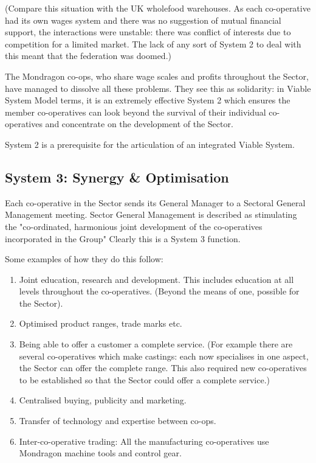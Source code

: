 (Compare this situation with the UK wholefood warehouses. As each co-operative had its own wages system and there was no suggestion of mutual financial support, the interactions were unstable: there was conflict of interests due to competition for a limited market. The lack of any sort of System 2 to deal with this meant that the federation was doomed.)

The Mondragon co-ops, who share wage scales and profits throughout the Sector, have managed to dissolve all these problems. They see this as solidarity: in Viable System Model terms, it is an extremely effective System 2 which ensures the member co-operatives can look beyond the survival of their individual co-operatives and concentrate on the development of the Sector.

System 2 is a prerequisite for the articulation of an integrated Viable System.

\subsection*{System 3: Synergy \& Optimisation}
Each co-operative in the Sector sends its General Manager to a Sectoral General Management meeting. Sector General Management is described as stimulating the "co-ordinated, harmonious joint development of the co-operatives incorporated in the Group" Clearly this is a System 3 function.

Some examples of how they do this follow:

\begin{enumerate}
  \item Joint education, research and development. This includes education at all levels throughout the co-operatives. (Beyond the means of one, possible for the Sector).

  \item Optimised product ranges, trade marks etc.

  \item Being able to offer a customer a complete service. (For example there are several co-operatives which make castings: each now specialises in one aspect, the Sector can offer the complete range. This also required new co-operatives to be established so that the Sector could offer a complete service.)

  \item Centralised buying, publicity and marketing.

  \item Transfer of technology and expertise between co-ops.

  \item Inter-co-operative trading: All the manufacturing co-operatives use Mondragon machine tools and control gear.

\end{enumerate}

